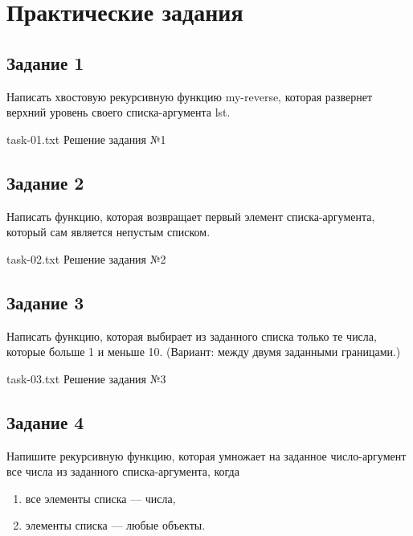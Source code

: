 \chapter{Практические задания}

\section{Задание 1}

Написать хвостовую рекурсивную функцию my-reverse, которая развернет верхний уровень своего списка-аргумента lst.

{task-01.txt} %
{Решение задания №1} %

\section{Задание 2}

Написать функцию, которая возвращает первый элемент списка-аргумента, который сам является непустым списком.

{task-02.txt} %
{Решение задания №2} %


\section{Задание 3}

Написать функцию, которая выбирает из заданного списка только те числа, которые больше 1 и меньше 10. (Вариант: между двумя заданными границами.)

{task-03.txt} %
{Решение задания №3} %

\section{Задание 4}

Напишите рекурсивную функцию, которая умножает на заданное число-аргумент все числа из заданного списка-аргумента, когда

\begin{enumerate}[label={\alph*)}]
	\item все элементы списка --- числа,
	\item элементы списка --- любые объекты.
\end{enumerate}

